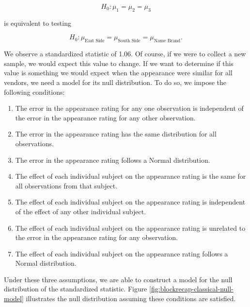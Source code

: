 \documentclass[
]{book}
\providecommand{\tightlist}{%
  \setlength{\itemsep}{0pt}\setlength{\parskip}{0pt}}
\theoremstyle{plain}
\theoremstyle{mydefn}
\theoremstyle{myexmpl}
\theoremstyle{remark}
\begin{document}
\[H_0: \mu_1 = \mu_2 = \mu_3\]

is equivalent to testing

\[H_0: \mu_{\text{East Side}} = \mu_{\text{South Side}} = \mu_{\text{Name Brand}}.\]

We observe a standardized statistic of 1.06. Of course, if we were to collect a new sample, we would expect this value to change. If we want to determine if this value is something we would expect when the appearance were similar for all vendors, we need a model for its null distribution. To do so, we impose the following conditions:

\begin{enumerate}
\def\labelenumi{\arabic{enumi}.}
\tightlist
\item
  The error in the appearance rating for any one observation is independent of the error in the appearance rating for any other observation.
\item
  The error in the appearance rating has the same distribution for all observations.
\item
  The error in the appearance rating follows a Normal distribution.
\item
  The effect of each individual subject on the appearance rating is the same for all observations from that subject.
\item
  The effect of each individual subject on the appearance rating is independent of the effect of any other individual subject.
\item
  The effect of each individual subject on the appearance rating is unrelated to the error in the appearance rating for any observation.
\item
  The effect of each individual subject on the appearance rating follows a Normal distribution.
\end{enumerate}

Under these three assumptions, we are able to construct a model for the null distribution of the standardized statistic. Figure \ref{fig:blockrecap-classical-null-model} illustrates the null distribution assuming these conditions are satisfied.
\end{document}
